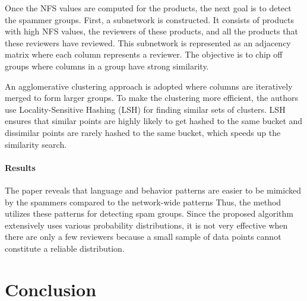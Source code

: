 \documentclass[11pt, oneside]{article}   	%
\begin{document}
\quad Once the NFS values are computed for the products, the next goal is to detect the spammer groups.
First, a subnetwork is constructed.
It consists of products with high NFS values, the reviewers of these products, and all the products that these reviewers have reviewed.
This subnetwork is represented as an adjacency matrix where each column represents a reviewer.
The objective is to chip off groups where columns in a group have strong similarity.

\quad An agglomerative clustering approach is adopted where columns are iteratively merged to form larger groups.
To make the clustering more efficient, the authors use Locality-Sensitive Hashing (LSH) for finding similar sets of clusters.
LSH ensures that similar points are highly likely to get hashed to the same bucket and dissimilar points are rarely hashed to the same bucket, which speeds up the similarity search.

\paragraph{Results}
\quad

\quad The paper reveals that language and behavior patterns are easier to be mimicked by the spammers compared to the network-wide patterns
Thus, the method utilizes these patterns for detecting spam groups.
Since the proposed algorithm extensively uses various probability distributions, it is not very effective when there are only a few reviewers because a small sample of data points cannot constitute a reliable distribution.

\section{Conclusion}
\end{document}
